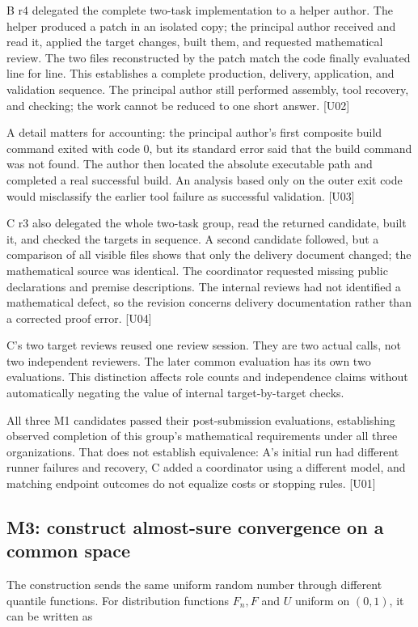 B r4 delegated the complete two-task implementation to a helper author. The helper produced a patch in an isolated copy; the principal author received and read it, applied the target changes, built them, and requested mathematical review. The two files reconstructed by the patch match the code finally evaluated line for line. This establishes a complete production, delivery, application, and validation sequence. The principal author still performed assembly, tool recovery, and checking; the work cannot be reduced to one short answer. [U02]

A detail matters for accounting: the principal author's first composite build command exited with code 0, but its standard error said that the build command was not found. The author then located the absolute executable path and completed a real successful build. An analysis based only on the outer exit code would misclassify the earlier tool failure as successful validation. [U03]

C r3 also delegated the whole two-task group, read the returned candidate, built it, and checked the targets in sequence. A second candidate followed, but a comparison of all visible files shows that only the delivery document changed; the mathematical source was identical. The coordinator requested missing public declarations and premise descriptions. The internal reviews had not identified a mathematical defect, so the revision concerns delivery documentation rather than a corrected proof error. [U04]

C's two target reviews reused one review session. They are two actual calls, not two independent reviewers. The later common evaluation has its own two evaluations. This distinction affects role counts and independence claims without automatically negating the value of internal target-by-target checks.

All three M1 candidates passed their post-submission evaluations, establishing observed completion of this group's mathematical requirements under all three organizations. That does not establish equivalence: A's initial run had different runner failures and recovery, C added a coordinator using a different model, and matching endpoint outcomes do not equalize costs or stopping rules. [U01]

\subsection[M3: construct almost-sure convergence on a common space]{\texorpdfstring{\protect\hypertarget{g12}{}M3: construct almost-sure convergence on a common space}{M3: construct almost-sure convergence on a common space}}
The construction sends the same uniform random number through different quantile functions. For distribution functions $F_n,F$ and $U$ uniform on $(0,1)$, it can be written as

